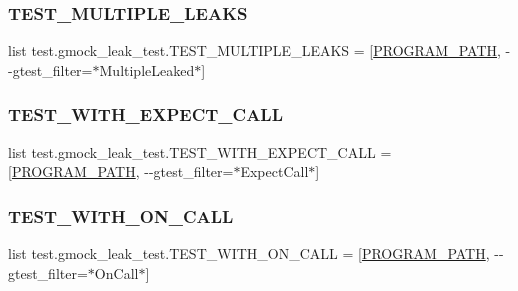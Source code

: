 \subsubsection{\texorpdfstring{TEST\_MULTIPLE\_LEAKS}{TEST\_MULTIPLE\_LEAKS}}
{\footnotesize\ttfamily list test.\+gmock\+\_\+leak\+\_\+test.\+T\+E\+S\+T\+\_\+\+M\+U\+L\+T\+I\+P\+L\+E\+\_\+\+L\+E\+A\+KS = \mbox{[}\mbox{\hyperlink{namespacetest_1_1gmock__leak__test_a9ed7230f000e029711f6abedc071cedb}{P\+R\+O\+G\+R\+A\+M\+\_\+\+P\+A\+TH}}, \textquotesingle{}-\/-\/gtest\+\_\+filter=$\ast$Multiple\+Leaked$\ast$\textquotesingle{}\mbox{]}}

\mbox{\label{namespacetest_1_1gmock__leak__test_a56df84ecc7d36433c839cf3e37af22af}} 
\subsubsection{\texorpdfstring{TEST\_WITH\_EXPECT\_CALL}{TEST\_WITH\_EXPECT\_CALL}}
{\footnotesize\ttfamily list test.\+gmock\+\_\+leak\+\_\+test.\+T\+E\+S\+T\+\_\+\+W\+I\+T\+H\+\_\+\+E\+X\+P\+E\+C\+T\+\_\+\+C\+A\+LL = \mbox{[}\mbox{\hyperlink{namespacetest_1_1gmock__leak__test_a9ed7230f000e029711f6abedc071cedb}{P\+R\+O\+G\+R\+A\+M\+\_\+\+P\+A\+TH}}, \textquotesingle{}-\/-\/gtest\+\_\+filter=$\ast$Expect\+Call$\ast$\textquotesingle{}\mbox{]}}

\mbox{\label{namespacetest_1_1gmock__leak__test_a0e072351d23a6afcf62cde9c1be0e46d}} 
\subsubsection{\texorpdfstring{TEST\_WITH\_ON\_CALL}{TEST\_WITH\_ON\_CALL}}
{\footnotesize\ttfamily list test.\+gmock\+\_\+leak\+\_\+test.\+T\+E\+S\+T\+\_\+\+W\+I\+T\+H\+\_\+\+O\+N\+\_\+\+C\+A\+LL = \mbox{[}\mbox{\hyperlink{namespacetest_1_1gmock__leak__test_a9ed7230f000e029711f6abedc071cedb}{P\+R\+O\+G\+R\+A\+M\+\_\+\+P\+A\+TH}}, \textquotesingle{}-\/-\/gtest\+\_\+filter=$\ast$On\+Call$\ast$\textquotesingle{}\mbox{]}}

